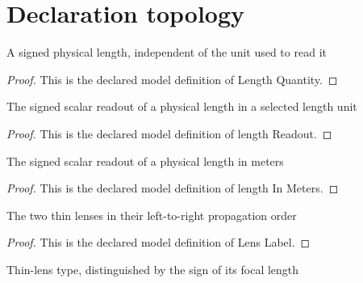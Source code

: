 \section{Declaration topology}
\begin{definition}
  \label{def:physics:phyx-mini-0078:phyxminiproblems-problemphyxmini0078-lengthquantity}
  A signed physical length, independent of the unit used to read it
\end{definition}
\begin{proof}
  This is the declared model definition of Length Quantity.
\end{proof}
\begin{definition}
  \label{def:physics:phyx-mini-0078:phyxminiproblems-problemphyxmini0078-lengthreadout}
  The signed scalar readout of a physical length in a selected length unit
\end{definition}
\begin{proof}
  This is the declared model definition of length Readout.
\end{proof}
\begin{definition}
  \label{def:physics:phyx-mini-0078:phyxminiproblems-problemphyxmini0078-lengthinmeters}
  The signed scalar readout of a physical length in meters
\end{definition}
\begin{proof}
  This is the declared model definition of length In Meters.
\end{proof}
\begin{definition}
  \label{def:physics:phyx-mini-0078:phyxminiproblems-problemphyxmini0078-lenslabel}
  The two thin lenses in their left-to-right propagation order
\end{definition}
\begin{proof}
  This is the declared model definition of Lens Label.
\end{proof}
\begin{definition}
  \label{def:physics:phyx-mini-0078:phyxminiproblems-problemphyxmini0078-thinlenskind}
  Thin-lens type, distinguished by the sign of its focal length
\end{definition}
